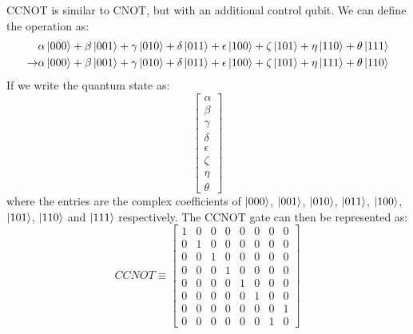 \documentclass[reqno]{amsart}
\numberwithin{equation}{section}
\numberwithin{figure}{section}
\begin{document}
\begin{justify}
CCNOT is similar to CNOT, but with an additional control qubit. We can define the operation as:
    \begin{equation}
        \begin{split}
            &\alpha\ket{000} + \beta\ket{001} + \gamma\ket{010} + \delta\ket{011} + \epsilon\ket{100} + \zeta\ket{101} + \eta\ket{110} + \theta\ket{111} \\ \rightarrow
            &\alpha\ket{000} + \beta\ket{001} + \gamma\ket{010} + \delta\ket{011} + \epsilon\ket{100} + \zeta\ket{101} + \eta\ket{111} + \theta\ket{110}
        \end{split}
    \end{equation}
If we write the quantum state as:
    \begin{equation}
        \begin{bmatrix}
            \alpha \\
            \beta \\
            \gamma \\
            \delta \\
            \epsilon \\
            \zeta \\
            \eta \\
            \theta
        \end{bmatrix}
        \label{eq:3qubitmatrix}
    \end{equation}
where the entries are the complex coefficients of $\ket{000}$, $\ket{001}$, $\ket{010}$, $\ket{011}$, $\ket{100}$, $\ket{101}$, $\ket{110}$ and $\ket{111}$ respectively. The CCNOT gate can then be represented as:
    \begin{equation}
        CCNOT \equiv \begin{bmatrix}
                    1 & 0 & 0 & 0 & 0 & 0 & 0 & 0 \\
                    0 & 1 & 0 & 0 & 0 & 0 & 0 & 0 \\
                    0 & 0 & 1 & 0 & 0 & 0 & 0 & 0 \\
                    0 & 0 & 0 & 1 & 0 & 0 & 0 & 0 \\
                    0 & 0 & 0 & 0 & 1 & 0 & 0 & 0 \\
                    0 & 0 & 0 & 0 & 0 & 1 & 0 & 0 \\
                    0 & 0 & 0 & 0 & 0 & 0 & 0 & 1 \\
                    0 & 0 & 0 & 0 & 0 & 0 & 1 & 0
                \end{bmatrix}
    \end{equation}


\end{justify}
\end{document}
